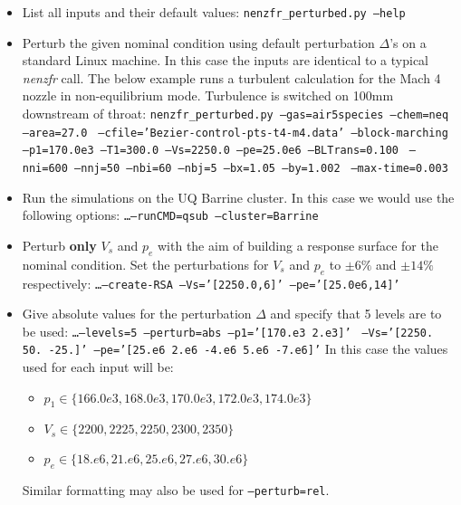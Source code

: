 \begin{itemize}
\item List all inputs and their default values:
\newline
\texttt{nenzfr\_perturbed.py --help}
\item Perturb the given nominal condition using default perturbation $\Delta$'s on a standard Linux machine. In this case the inputs are identical to a typical \textit{nenzfr} call. The below example runs a turbulent calculation for the Mach 4 nozzle in non-equilibrium mode. Turbulence is switched on 100mm downstream of throat:
\newline
\texttt{nenzfr\_perturbed.py --gas=air5species --chem=neq --area=27.0}
\newline
\texttt{    --cfile='Bezier-control-pts-t4-m4.data' --block-marching }
\newline
\texttt{    --p1=170.0e3 --T1=300.0 --Vs=2250.0 --pe=25.0e6 --BLTrans=0.100}
\newline
\texttt{    --nni=600 --nnj=50 --nbi=60 --nbj=5 --bx=1.05 --by=1.002}
\newline
\texttt{     --max-time=0.003}
\item Run the simulations on the UQ Barrine cluster. In this case we would use the following options:
\newline
\texttt{\dots --runCMD=qsub --cluster=Barrine}
\item Perturb \textbf{only} $V_s$ and $p_e$ with the aim of building a response surface for the nominal condition. Set the perturbations for $V_s$ and $p_e$ to $\pm6\%$ and $\pm14\%$ respectively:
\newline
\texttt{\dots --create-RSA --Vs='[2250.0,6]' --pe='[25.0e6,14]'}
\item Give absolute values for the perturbation $\Delta$ and specify that 5 levels are to be used:
\newline
\texttt{\dots --levels=5 --perturb=abs --p1='[170.e3 2.e3]' }
\newline \texttt{--Vs='[2250. 50. -25.]' --pe='[25.e6 2.e6 -4.e6 5.e6 -7.e6]'}
\newline
In this case the values used for each input will be: 
\begin{itemize}
\item[] $p_1\in\{166.0e3, 168.0e3, 170.0e3, 172.0e3, 174.0e3\}$
\item[] $V_s\in\{2200, 2225, 2250, 2300, 2350\}$
\item[] $p_e\in\{18.e6, 21.e6, 25.e6, 27.e6, 30.e6\}$ 
\end{itemize}
Similar formatting may also be used for \texttt{--perturb=rel}.
\end{itemize}

